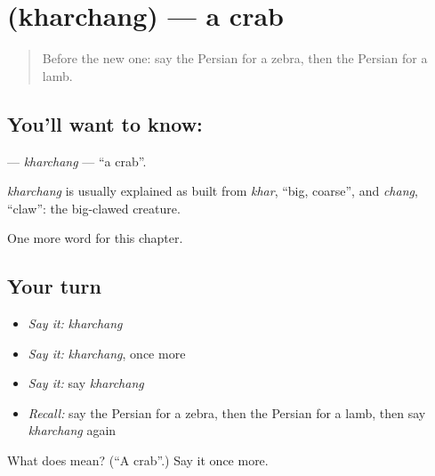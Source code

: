 \section[\texorpdfstring{\fa{خرچنگ} (kharchang)}{خرچنگ (kharchang)}]{ (kharchang) — a crab}

\label{lesson:FA-C209-kharchang}



\begin{quote}
Before the new one: say the Persian for a zebra, then the Persian for a lamb.
\end{quote}

\subsection*{You'll want to know: }
\textbf{} — \emph{kharchang} — \textquotedblleft{}a crab\textquotedblright{}.

\begin{cousinweb}
\emph{kharchang} is usually explained as built from \emph{khar}, \textquotedblleft{}big, coarse\textquotedblright{}, and \emph{chang}, \textquotedblleft{}claw\textquotedblright{}: the big-clawed creature.
\end{cousinweb}

\begin{grammarlens}[title={What you've built}]
One more word for this chapter.
\end{grammarlens}

\subsection*{Your turn}
\begin{itemize}
\raggedright
  \item \emph{Say it:} \emph{kharchang}
  \item \emph{Say it:} \emph{kharchang}, once more
  \item \emph{Say it:} say \emph{kharchang}
  \item \emph{Recall:} say the Persian for a zebra, then the Persian for a lamb, then say \emph{kharchang} again
\end{itemize}

\begin{tcolorbox}[breakable,colback=teal!4,colframe=teal!35!black,title={Before you move on}]
What does  mean? (\textquotedblleft{}A crab\textquotedblright{}.) Say it once more.
\end{tcolorbox}
